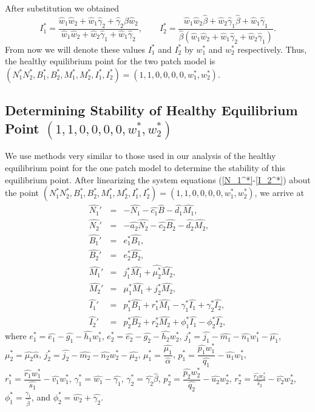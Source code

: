 \documentclass[letter,10pt]{article}
\begin{document}
After substitution we obtained
\begin{equation*}
I_1^* = \dfrac{\hat{w}_1\hat{w}_2+\hat{w}_1\hat{\gamma}_2+\hat{\gamma}_2\hat{\beta}\hat{w}_2}{\hat{w}_1\hat{w}_2+\hat{w}_2\hat{\gamma}_1+\hat{w}_1\hat{\gamma}_2}, \qquad 
I_2^* = \dfrac{\hat{w}_1\hat{w}_2\hat{\beta}+\hat{w}_2\hat{\gamma}_1\hat{\beta}+\hat{w}_1\hat{\gamma}_1}{\hat{\beta}(\hat{w}_1\hat{w}_2+\hat{w}_1\hat{\gamma}_2+\hat{w}_2\hat{\gamma}_1)}.
\end{equation*}
From now we will denote these values $I_1^*$ and $I_2^*$ by $w_1^*$ and $w_2^*$ respectively. Thus, the healthy equilibrium point for the two patch model is $(N_1^*N_2^*, B_1^*, B_2^*, M_1^*, M_2^*, I_1^*, I_2^*) = (1, 1, 0, 0, 0, 0, w_1^*, w_2^*)$.

\subsection{Determining Stability of Healthy Equilibrium Point $(1, 1, 0, 0, 0, 0, w_1^*, w_2^*)$}

We use methods very similar to those used in our analysis of the healthy equilibrium point for the one patch model to determine the stability of this equilibrium point. After linearizing the system equations (\ref{N_1^*}-\ref{I_2^*}) about the point $(N_1^*N_2^*, B_1^*, B_2^*, M_1^*, M_2^*, I_1^*, I_2^*) = (1, 1, 0, 0, 0, 0, w_1^*, w_2^*)$, we arrive at
\begin{eqnarray}
\hat{N_1}'&=&-\hat{N_1}-\hat{c_1}\hat{B}-\hat{d_1}\hat{M_1}, \nonumber\\
\hat{N_2}'&=&-\hat{a_2}\hat{N_2}-\hat{c_2}\hat{B_2}-\hat{d_2}\hat{M_2}, \nonumber\\
\hat{B_1}'&=&e_1^*\hat{B_1}, \nonumber\\
\hat{B_2}'&=&e_2^*\hat{B_2}, \nonumber\\
\hat{M_1}'&=&j_1^*\hat{M_1}+\hat{\mu _2^*}\hat{M_2}, \nonumber\\
\hat{M_2}'&=&\mu _1^*\hat{M_1}+j_2^*\hat{M_2}, \nonumber\\
\hat{I_1}'&=&p_1^*\hat{B_1}+r_1^*\hat{M_1}-\gamma _1^*\hat{I_1}+\gamma _2^*\hat{I_2}, \nonumber\\
\hat{I_2}'&=&p_2^*\hat{B_2}+r_2^*\hat{M_2}+\phi _1^*\hat{I_1}-\phi _2^*\hat{I_2},\nonumber
\end{eqnarray}
where $e_1^*=\hat{e_1}-\hat{g_1}-\hat{h_1}w_1^*$,  $e_2^*=\hat{e_2}-\hat{g_2}-\hat{h_2}w_2^*$, $j_1^*=\hat{j_1}-\hat{m_1}-\hat{n_1}w_1^*-\hat{\mu _1}$, $\mu _2^*=\hat{\mu _2}\hat{\alpha}$,  $j_2^*=\hat{j_2}-\hat{m_2}-\hat{n_2}w_2^*-\hat{\mu _2}$, $\mu _1^*=\dfrac{\hat{\mu _1}}{\hat{\alpha}}$, $p_1^*=\dfrac{\hat{p_1}w_1^*}{\hat{q_1}}-\hat{u_1}w_1^*$,  $r_1^*=\dfrac{\hat{r_1}w_1^*}{\hat{s_1}}-\hat{v_1}w_1^*$, $\gamma _1^*=\hat{w_1}-\hat{\gamma _1}$, $\gamma _2^*=\hat{\gamma _2}\hat{\beta}$, $p_2^*=\dfrac{\hat{p_2}w_2^*}{\hat{q_2}}-\hat{u_2}w_2^*$, $r_2^*=\frac{\hat{r_2}w_2^*}{\hat{s_2}}-\hat{v_2}w_2^*$,  $\phi _1^*=\frac{\gamma _1}{\hat{\beta}}$, and $\phi _2^*=\hat{w_2}+\hat{\gamma _2}$.
\end{document}
